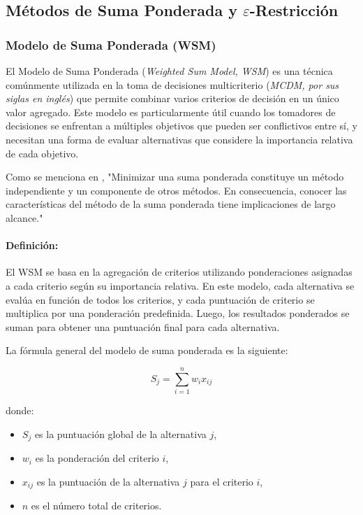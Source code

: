 \documentclass[12pt]{article}
\begin{document}
\subsection{Métodos de Suma Ponderada y $\varepsilon$-Restricción}

\subsubsection{Modelo de Suma Ponderada (WSM)}

El Modelo de Suma Ponderada (\textit{Weighted Sum Model, WSM}) es una técnica comúnmente utilizada en la toma de decisiones multicriterio (\textit{MCDM, por sus siglas en inglés}) que permite combinar varios criterios de decisión en un único valor agregado. Este modelo es particularmente útil cuando los tomadores de decisiones se enfrentan a múltiples objetivos que pueden ser conflictivos entre sí, y necesitan una forma de evaluar alternativas que considere la importancia relativa de cada objetivo.

Como se menciona en \cite{Marler2010}, "Minimizar una suma ponderada constituye un método independiente y un componente de otros métodos. En consecuencia, conocer las características del método de la suma ponderada tiene implicaciones de largo alcance."

\paragraph{Definición:}
El WSM se basa en la agregación de criterios utilizando ponderaciones asignadas a cada criterio según su importancia relativa. En este modelo, cada alternativa se evalúa en función de todos los criterios, y cada puntuación de criterio se multiplica por una ponderación predefinida. Luego, los resultados ponderados se suman para obtener una puntuación final para cada alternativa.

La fórmula general del modelo de suma ponderada es la siguiente:

\[
S_j = \sum_{i=1}^n w_i x_{ij}
\]

donde:
\begin{itemize}
    \item $S_j$ es la puntuación global de la alternativa $j$,
    \item $w_i$ es la ponderación del criterio $i$,
    \item $x_{ij}$ es la puntuación de la alternativa $j$ para el criterio $i$,
    \item $n$ es el número total de criterios.
\end{itemize}
\end{document}
